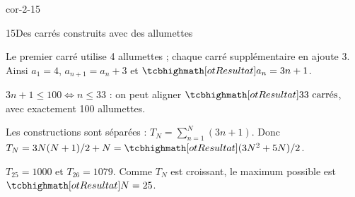 \begin{blocLivre}{cor-2-15}
\begin{corrige}{15}{Des carrés construits avec des allumettes}
\begin{questions}
\item Le premier carré utilise 4 allumettes ; chaque carré supplémentaire en ajoute 3.
Ainsi $a_1=4$, $a_{n+1}=a_n+3$ et $\res{a_n=3n+1}$.
\item $3n+1\leq100\iff n\leq33$ : on peut aligner $\res{33\text{ carrés}}$,
avec exactement 100 allumettes.
\item Les constructions sont séparées : $T_N=\sum_{n=1}^N(3n+1)$.
Donc $T_N=3N(N+1)/2+N=\res{(3N^2+5N)/2}$.
\item $T_{25}=1000$ et $T_{26}=1079$. Comme $T_N$ est croissant,
le maximum possible est $\res{N=25}$.
\end{questions}
\end{corrige}
\end{blocLivre}

